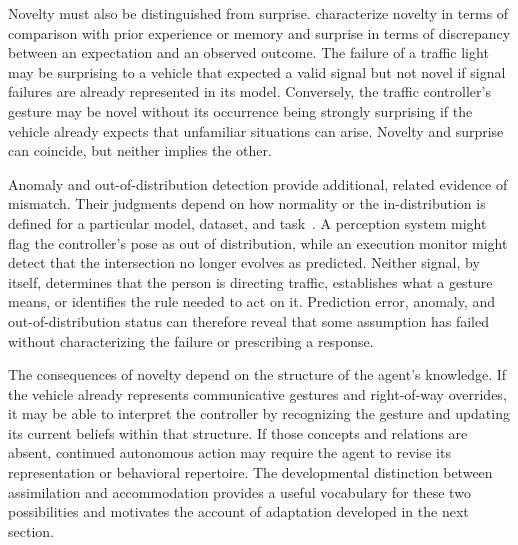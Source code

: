 Novelty must also be distinguished from surprise.
\label{sec:novelty_surprise}
\citet{barto2013novelty} characterize novelty in terms of comparison with prior experience or memory and surprise in terms of discrepancy between an expectation and an observed outcome.
The failure of a traffic light may be surprising to a vehicle that expected a valid signal but not novel if signal failures are already represented in its model.
Conversely, the traffic controller's gesture may be novel without its occurrence being strongly surprising if the vehicle already expects that unfamiliar situations can arise.
Novelty and surprise can coincide, but neither implies the other.

Anomaly and out-of-distribution detection provide additional, related evidence of mismatch.
Their judgments depend on how normality or the in-distribution is defined for a particular model, dataset, and task~\citep{yang2024generalized}.
A perception system might flag the controller's pose as out of distribution, while an execution monitor might detect that the intersection no longer evolves as predicted.
Neither signal, by itself, determines that the person is directing traffic, establishes what a gesture means, or identifies the rule needed to act on it.
Prediction error, anomaly, and out-of-distribution status can therefore reveal that some assumption has failed without characterizing the failure or prescribing a response.

The consequences of novelty depend on the structure of the agent's knowledge.
If the vehicle already represents communicative gestures and right-of-way overrides, it may be able to interpret the controller by recognizing the gesture and updating its current beliefs within that structure.
If those concepts and relations are absent, continued autonomous action may require the agent to revise its representation or behavioral repertoire.
The developmental distinction between assimilation and accommodation provides a useful vocabulary for these two possibilities and motivates the account of adaptation developed in the next section.
